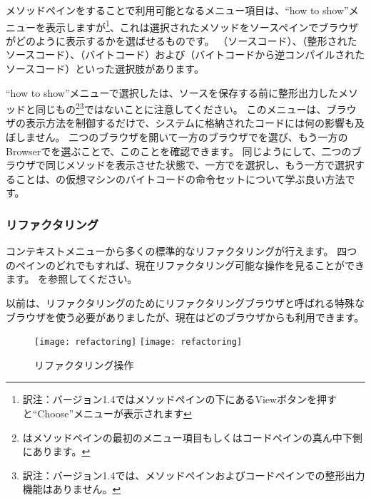 \documentclass[a4paper,10pt,twoside]{book}
\begin{document}
メソッドペインを\actclick することで利用可能となるメニュー項目は、``how to show''メニューを表示しますが\footnote{訳注：バージョン1.4ではメソッドペインの下にあるViewボタンを押すと``Choose''メニューが表示されます}、これは選択されたメソッドをソースペインでブラウザがどのように表示するかを選ばせるものです。 （ソースコード）、（整形されたソースコード）、（バイトコード）および（バイトコードから逆コンパイルされたソースコード）といった選択肢があります。

``how to show''メニューで選択したは、ソースを保存する前に整形出力したメソッドと同じもの\footnote{はメソッドペインの最初のメニュー項目もしくはコードペインの真ん中下側にあります。}\footnote{訳注：バージョン1.4では、メソッドペインおよびコードペインでの整形出力機能はありません。}ではないことに注意してください。
このメニューは、ブラウザの表示方法を制御するだけで、システムに格納されたコードには何の影響も及ぼしません。
二つのブラウザを開いて一方のブラウザでを選び、もう一方のBrowserでを選ぶことで、このことを確認できます。
同じようにして、二つのブラウザで同じメソッドを表示させた状態で、一方でを選択し、もう一方で選択することは、\pharo の仮想マシンのバイトコードの命令セットについて学ぶ良い方法です。

\subsubsection{リファクタリング}

コンテキストメニューから多くの標準的なリファクタリングが行えます。
四つのペインのどれでも\actclick すれば、現在リファクタリング可能な操作を見ることができます。
を参照してください。

以前は、リファクタリングのためにリファクタリングブラウザと呼ばれる特殊なブラウザを使う必要がありましたが、現在はどのブラウザからも利用できます。

\begin{figure}[btp]
\begin{center}
\ifluluelse
{\texttt{[image: refactoring]}}
{\texttt{[image: refactoring]}}
\end{center}
\caption{リファクタリング操作}
\end{figure}
\end{document}
